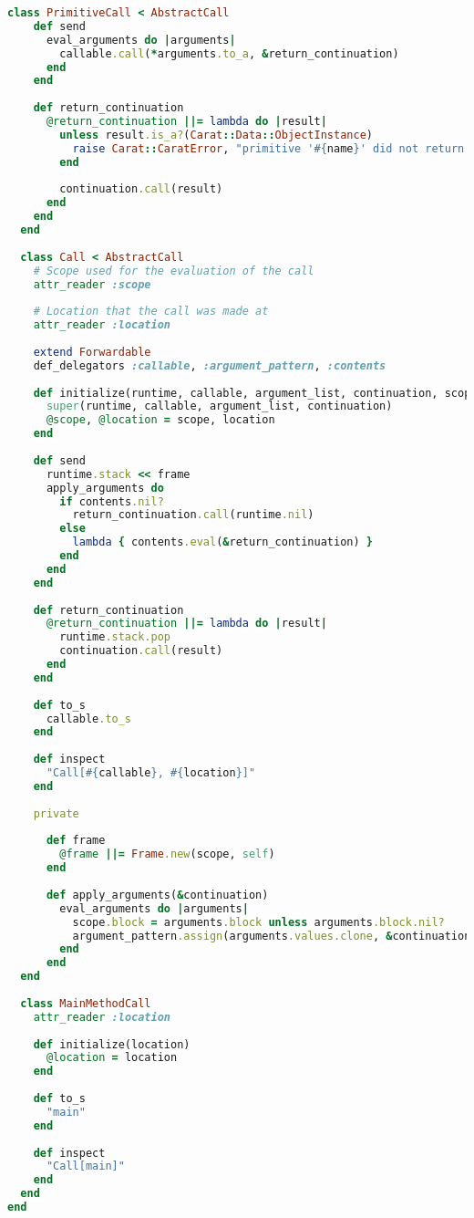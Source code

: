 \begin{lstlisting}[title={\small\Helvetica runtime/call.rb},language=Ruby]
  class PrimitiveCall < AbstractCall
    def send
      eval_arguments do |arguments|
        callable.call(*arguments.to_a, &return_continuation)
      end
    end
    
    def return_continuation
      @return_continuation ||= lambda do |result|
        unless result.is_a?(Carat::Data::ObjectInstance)
          raise Carat::CaratError, "primitive '#{name}' did not return an ObjectInstance: #{result.inspect}"
        end
        
        continuation.call(result)
      end
    end
  end
  
  class Call < AbstractCall
    # Scope used for the evaluation of the call
    attr_reader :scope
    
    # Location that the call was made at
    attr_reader :location
    
    extend Forwardable
    def_delegators :callable, :argument_pattern, :contents
    
    def initialize(runtime, callable, argument_list, continuation, scope, location)
      super(runtime, callable, argument_list, continuation)
      @scope, @location = scope, location
    end
    
    def send
      runtime.stack << frame
      apply_arguments do
        if contents.nil?
          return_continuation.call(runtime.nil)
        else
          lambda { contents.eval(&return_continuation) }
        end
      end
    end
    
    def return_continuation
      @return_continuation ||= lambda do |result|
        runtime.stack.pop
        continuation.call(result)
      end
    end
    
    def to_s
      callable.to_s
    end
    
    def inspect
      "Call[#{callable}, #{location}]"
    end
    
    private
    
      def frame
        @frame ||= Frame.new(scope, self)
      end
      
      def apply_arguments(&continuation)
        eval_arguments do |arguments|
          scope.block = arguments.block unless arguments.block.nil?
          argument_pattern.assign(arguments.values.clone, &continuation)
        end
      end
  end
  
  class MainMethodCall
    attr_reader :location
    
    def initialize(location)
      @location = location
    end
    
    def to_s
      "main"
    end
    
    def inspect
      "Call[main]"
    end
  end
end

\end{lstlisting}
